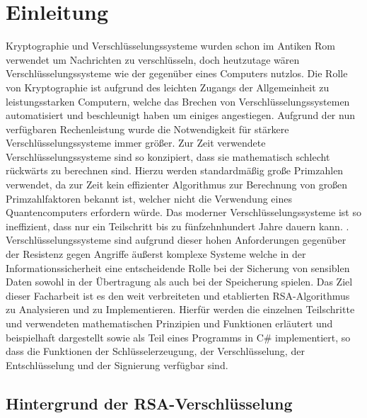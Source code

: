 \chapter{Einleitung}

Kryptographie und Verschlüsselungssysteme wurden schon im Antiken Rom verwendet um Nachrichten zu verschlüsseln\cite{aichner22}, doch heutzutage wären Verschlüsselungssysteme wie der  gegenüber eines Computers nutzlos.
Die Rolle von Kryptographie ist aufgrund des leichten Zugangs der Allgemeinheit zu leistungsstarken Computern, welche das Brechen von  Verschlüsselungssystemen automatisiert und beschleunigt haben um einiges angestiegen.
Aufgrund der nun verfügbaren Rechenleistung wurde die Notwendigkeit für stärkere Verschlüsselungssysteme immer größer. Zur Zeit verwendete Verschlüsselungssysteme sind so konzipiert, dass sie mathematisch schlecht rückwärts zu berechnen sind.
Hierzu werden standardmäßig große Primzahlen verwendet, da zur Zeit kein effizienter Algorithmus zur Berechnung von großen Primzahlfaktoren bekannt ist, welcher nicht die Verwendung eines Quantencomputers erfordern würde.
Das  moderner Verschlüsselungssysteme ist so ineffizient, dass nur ein Teilschritt bis zu fünfzehnhundert Jahre dauern kann\cite{kleinjung10}.
\cite{kleinjung10}.
Verschlüsselungssysteme sind aufgrund dieser hohen Anforderungen gegenüber der Resistenz gegen Angriffe äußerst komplexe Systeme welche in der Informationssicherheit eine entscheidende Rolle bei der Sicherung von sensiblen Daten sowohl in der Übertragung als auch bei der Speicherung spielen\cite{aichner22}.
Das Ziel dieser Facharbeit ist es den weit verbreiteten und etablierten RSA-Algorithmus zu Analysieren und zu Implementieren. Hierfür werden die einzelnen Teilschritte und verwendeten mathematischen Prinzipien und Funktionen erläutert und beispielhaft dargestellt sowie als Teil eines Programms in C\# implementiert, so dass die Funktionen der Schlüsselerzeugung, der Verschlüsselung, der Entschlüsselung und der Signierung verfügbar sind.
\newpage

\section{Hintergrund der RSA-Verschlüsselung}


